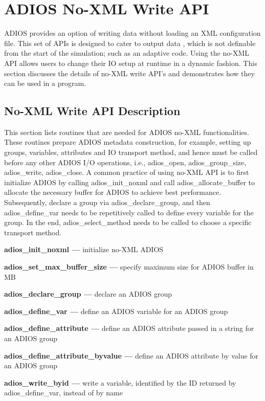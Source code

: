 \chapter{ADIOS No-XML Write API }
\label{chapter-noxml-api}

ADIOS provides an option of writing data without loading an XML configuration file. 
This set of APIs is designed to cater to output data , which is not definable from 
the start of the simulation; such as an adaptive code. Using the no-XML API allows 
users to change their IO setup at runtime in a dynamic fashion.  This section discusses 
the details of no-XML write API's and demonstrates how they can be used in a program. 

\section{No-XML Write API Description}

This section lists routines that are needed for ADIOS no-XML functionalities. These 
routines prepare ADIOS metadata construction, for example, setting up groups, variables, 
attributes and IO transport method, and hence must be called before any other ADIOS 
I/O operations, i.e., adios\_open, adios\_group\_size, adios\_write, adios\_close. 
A common practice of using no-XML API is to first initialize ADIOS by calling 
adios\_init\_noxml 
and call adios\_allocate\_buffer to allocate the necessary buffer for ADIOS to achieve 
best performance. Subsequently, declare a group via adios\_declare\_group, and then 
adios\_define\_var needs to be repetitively called to define every variable 
for the group.  In the end, adios\_select\_method needs to be called to choose 
a specific transport method.

\textbf{adios\_init\_noxml ---} initialize no-XML ADIOS

\textbf{adios\_set\_max\_buffer\_size ---} specify maximum size for ADIOS buffer in MB

\textbf{adios\_declare\_group ---} declare an ADIOS group 

\textbf{adios\_define\_var ---} define an ADIOS variable for an ADIOS group

\textbf{adios\_define\_attribute ---} define an ADIOS attribute passed in a string for an ADIOS group

\textbf{adios\_define\_attribute\_byvalue ---} define an ADIOS attribute by value for an ADIOS group

\textbf{adios\_write\_byid ---} write a variable, identified by the ID returned by adios\_define\_var, instead of by name

